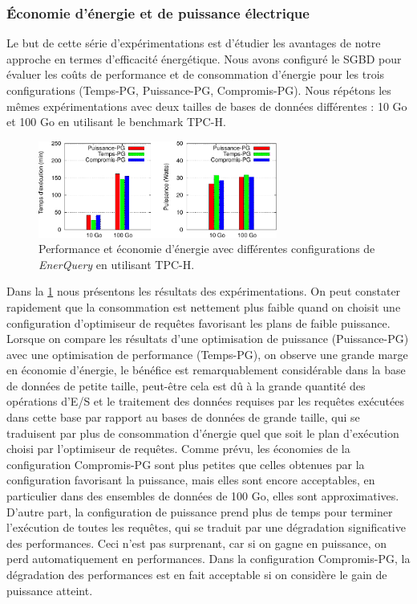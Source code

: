 \subsubsection{Économie d'énergie et de puissance électrique}\label{subsubsec:PowerEnergySavingPostgres}
Le but de cette série d'expérimentations est d'étudier les avantages de notre approche en termes d'efficacité énergétique. Nous avons configuré le SGBD pour évaluer les coûts de performance et de consommation d'énergie pour les trois configurations (Temps-PG, Puissance-PG, Compromis-PG). Nous répétons les mêmes expérimentations avec deux tailles de bases de données différentes : 10 Go et 100 Go en utilisant le benchmark TPC-H.

\begin{figure}
  \centering
  \includegraphics[width=0.7\textwidth]{chapitre5/chap5Fig/power-time.pdf}
  \caption{Performance et économie d'énergie avec différentes configurations de \textit{EnerQuery} en utilisant TPC-H.}\label{fig:power-time}
\end{figure}

Dans la \ref{fig:power-time} nous présentons les résultats des expérimentations. On peut constater rapidement que la consommation est nettement plus faible quand on choisit une configuration d'optimiseur de requêtes favorisant les plans de faible puissance. Lorsque on compare les résultats d'une optimisation de puissance (Puissance-PG) avec une optimisation de performance (Temps-PG), on observe une grande marge en économie d'énergie, le bénéfice est remarquablement considérable dans la base de données de petite taille, peut-être cela est dû à la grande quantité des opérations d'E/S et le traitement des données requises par les requêtes exécutées dans cette base par rapport au bases de données de grande taille, qui se traduisent par plus de consommation d'énergie quel que soit le plan d'exécution choisi par l'optimiseur de requêtes.
Comme prévu, les économies de la configuration Compromis-PG sont plus petites que celles obtenues par la configuration favorisant la puissance, mais elles sont encore acceptables, en particulier dans des ensembles de données de 100 Go, elles sont approximatives.
D'autre part, la configuration de puissance prend plus de temps pour terminer l'exécution de toutes les requêtes, qui se traduit par une dégradation significative des performances. Ceci n'est pas surprenant, car si on gagne en puissance, on perd automatiquement en performances. Dans la configuration Compromis-PG, la dégradation des performances est en fait acceptable si on considère le gain de puissance atteint.

